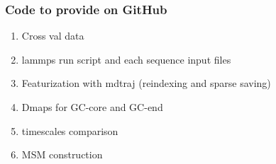 \documentclass[journal=jpcbfk,manuscript=article]{achemso}
\begin{document}

\subsubsection{\label{sec:Results}Code to provide on GitHub} 
\begin{enumerate}
    \item{Cross val data}
    \item lammps run script and each sequence input files
    \item Featurization with mdtraj (reindexing and sparse saving)
    \item Dmaps for GC-core and GC-end
    \item timescales comparison
    \item MSM construction
\end{enumerate}
\end{document}

